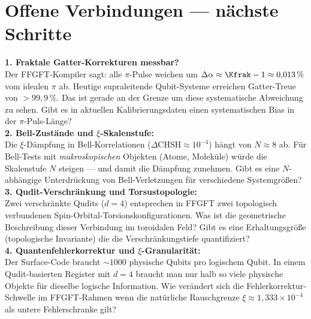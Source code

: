 \section{Offene Verbindungen --- nächste Schritte}
\label{sec:offene-175}

\begin{significance}
\textbf{1. Fraktale Gatter-Korrekturen messbar?}\\
Der FFGFT-Kompiler sagt: alle $\pi$-Pulse weichen
um $\Delta\alpha \approx \Kfrak - 1 \approx 0{,}013\,\%$
vom idealen $\pi$ ab.
Heutige supraleitende Qubit-Systeme erreichen
Gatter-Treue von $>99{,}9\,\%$.
Das ist gerade an der Grenze um diese
systematische Abweichung zu sehen.
Gibt es in aktuellen Kalibrierungsdaten
einen systematischen Bias in der $\pi$-Puls-Länge?\\[6pt]

\textbf{2. Bell-Zustände und $\xi$-Skalenstufe:}\\
Die $\xi$-Dämpfung in Bell-Korrelationen
($\Delta\text{CHSH} \approx 10^{-4}$) hängt von $N \approx 8$ ab.
Für Bell-Tests mit \emph{makroskopischen} Objekten
(Atome, Moleküle) würde die Skalenstufe $N$ steigen ---
und damit die Dämpfung zunehmen.
Gibt es eine $N$-abhängige Unterdrückung
von Bell-Verletzungen für verschiedene Systemgrößen?\\[6pt]

\textbf{3. Qudit-Verschränkung und Torsustopologie:}\\
Zwei verschränkte Qudits ($d = 4$) entsprechen
in FFGFT zwei topologisch verbundenen
Spin-Orbital-Torsionskonfigurationen.
Was ist die geometrische Beschreibung
dieser Verbindung im toroidalen Feld?
Gibt es eine Erhaltungsgröße (topologische Invariante)
die die Verschränkungstiefe quantifiziert?\\[6pt]

\textbf{4. Quantenfehlerkorrektur und $\xi$-Granularität:}\\
Der Surface-Code braucht $\sim 1000$ physische Qubits
pro logischem Qubit.
In einem Qudit-basierten Register mit $d = 4$
braucht man nur halb so viele physische Objekte
für dieselbe logische Information.
Wie verändert sich die Fehlerkorrektur-Schwelle
im FFGFT-Rahmen wenn die natürliche Rauschgrenze
$\xi \approx 1{,}333 \times 10^{-4}$ als
untere Fehlerschranke gilt?
\end{significance}

